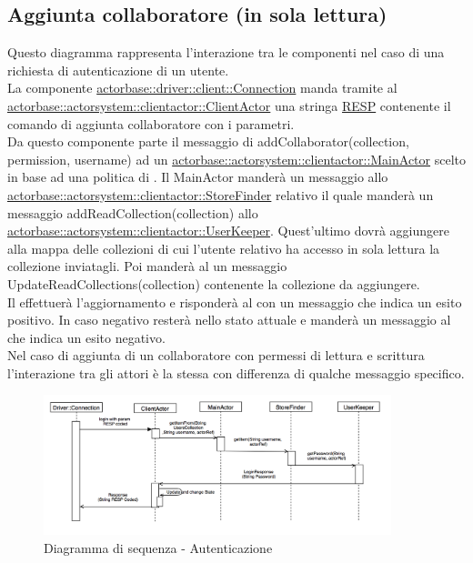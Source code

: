 \documentclass{scalatekids-article}
\begin{document}
\subsection{Aggiunta collaboratore (in sola lettura)}

Questo diagramma rappresenta l'interazione tra le componenti nel caso di una richiesta di autenticazione di un utente.\\
La componente \hyperref[sec:actorbase::driver::client::Connection]{actorbase::driver::client::Connection}
manda tramite  al \hyperref[sec:actorbase::actorsystem::clientactor::ClientActor]{actorbase::actorsystem::clientactor::ClientActor}
una stringa \hyperref[sec:RESP]{RESP} contenente il comando di aggiunta collaboratore  con
i parametri.\\
Da questo componente parte il messaggio di addCollaborator(collection, permission, username) ad un \hyperref[sec:actorbase::actorsystem::clientactor::MainActor]{actorbase::actorsystem::clientactor::MainActor} scelto in base ad una
politica di . Il MainActor manderà un messaggio allo
\hyperref[sec:actorbase::actorsystem::clientactor::StoreFinder]{actorbase::actorsystem::clientactor::StoreFinder}
relativo il quale manderà un messaggio addReadCollection(collection) allo
\hyperref[sec:actorbase::actorsystem::clientactor::UserKeeper]{actorbase::actorsystem::clientactor::UserKeeper}.
Quest'ultimo dovrà aggiungere alla mappa delle collezioni di cui l'utente
relativo ha accesso in sola lettura la collezione inviatagli.
Poi manderà al  un messaggio UpdateReadCollections(collection)
contenente la collezione da aggiungere.\\
Il  effettuerà l'aggiornamento e risponderà al 
con un messaggio che indica un esito positivo. In caso negativo resterà nello
stato attuale e manderà un messaggio al  che indica un esito
negativo.\\
Nel caso di aggiunta di un collaboratore con permessi di lettura e scrittura
l'interazione tra gli attori è la stessa con differenza di qualche messaggio
specifico.\\
\begin{figure}[H]
  \begin{center}
    \includegraphics[width=0.9\textwidth, keepaspectratio]{img/diagrammiSequenza/esempioAuth.png}
    \caption{Diagramma di sequenza - Autenticazione}
  \end{center}
\end{figure}
\end{document}
